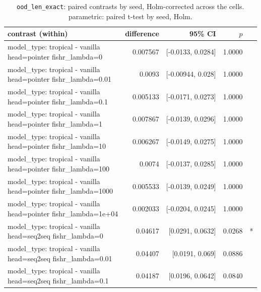\documentclass[10pt]{article}
\makeatletter
\newcommand{\stackcell}[1]{\begin{tabular}[t]{@{}l@{}}#1\end{tabular}}
\makeatother
\begin{document}
{\small
\begin{longtable}{lrrrl}
\caption{\texttt{ood\_len\_exact}: paired contrasts by seed, Holm-corrected across the cells. parametric: paired t-test by seed, Holm.}\label{tab:paired-ood_len_exact}\\
\toprule
contrast (within) & difference & 95\% CI & $p$ & \\
\midrule
\endhead
\stackcell{model\_type: tropical - vanilla\\\footnotesize head=pointer fishr\_lambda=0 } & 0.007567 & [-0.0133, 0.0284] & 1.0000 & \\
\stackcell{model\_type: tropical - vanilla\\\footnotesize head=pointer fishr\_lambda=0.01 } & 0.0093 & [-0.00944, 0.028] & 1.0000 & \\
\stackcell{model\_type: tropical - vanilla\\\footnotesize head=pointer fishr\_lambda=0.1 } & 0.005133 & [-0.0171, 0.0273] & 1.0000 & \\
\stackcell{model\_type: tropical - vanilla\\\footnotesize head=pointer fishr\_lambda=1 } & 0.007867 & [-0.0139, 0.0296] & 1.0000 & \\
\stackcell{model\_type: tropical - vanilla\\\footnotesize head=pointer fishr\_lambda=10 } & 0.006267 & [-0.0149, 0.0275] & 1.0000 & \\
\stackcell{model\_type: tropical - vanilla\\\footnotesize head=pointer fishr\_lambda=100 } & 0.0074 & [-0.0137, 0.0285] & 1.0000 & \\
\stackcell{model\_type: tropical - vanilla\\\footnotesize head=pointer fishr\_lambda=1000 } & 0.005533 & [-0.0139, 0.0249] & 1.0000 & \\
\stackcell{model\_type: tropical - vanilla\\\footnotesize head=pointer fishr\_lambda=1e+04 } & 0.002033 & [-0.0204, 0.0245] & 1.0000 & \\
\stackcell{model\_type: tropical - vanilla\\\footnotesize head=seq2seq fishr\_lambda=0 } & 0.04617 & [0.0291, 0.0632] & 0.0268 & *\\
\stackcell{model\_type: tropical - vanilla\\\footnotesize head=seq2seq fishr\_lambda=0.01 } & 0.04407 & [0.0191, 0.069] & 0.0886 & \\
\stackcell{model\_type: tropical - vanilla\\\footnotesize head=seq2seq fishr\_lambda=0.1 } & 0.04187 & [0.0196, 0.0642] & 0.0840 & \\

\end{longtable}}
\end{document}
